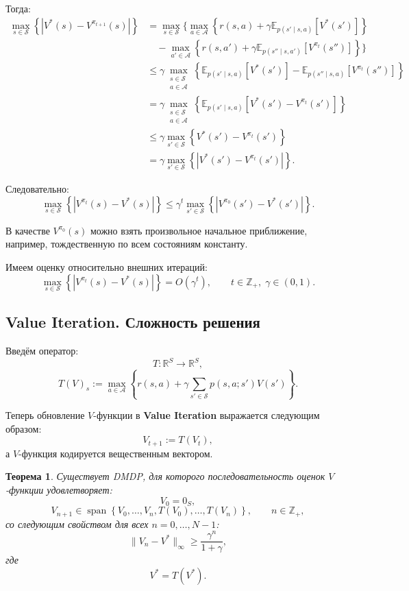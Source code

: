 \documentclass[12pt,a4paper]{article}
\newtheorem{theorem}{Теорема}
\begin{document}
Тогда:
\[
\begin{aligned}
\max_{s \in \mathcal S}
\left\{
|V^\ast(s)-V^{\pi_{t+1}}(s)|
\right\}
&=
\max_{s \in \mathcal S}
\Bigg\{
\max_{a \in \mathcal A}
\left\{
r(s,a)
+
\gamma
\mathbb E_{p(s'\mid s,a)}
\left[
V^\ast(s')
\right]
\right\}
\\
&\quad -
\max_{a' \in \mathcal A}
\left\{
r(s,a')
+
\gamma
\mathbb E_{p(s''\mid s,a')}
\left[
V^{\pi_t}(s'')
\right]
\right\}
\Bigg\}
\\
&\le
\gamma
\max_{\substack{s \in \mathcal S\\ a \in \mathcal A}}
\left\{
\mathbb E_{p(s'\mid s,a)}
\left[
V^\ast(s')
\right]
-
\mathbb E_{p(s''\mid s,a)}
\left[
V^{\pi_t}(s'')
\right]
\right\}
\\
&=
\gamma
\max_{\substack{s \in \mathcal S\\ a \in \mathcal A}}
\left\{
\mathbb E_{p(s'\mid s,a)}
\left[
V^\ast(s')-V^{\pi_t}(s')
\right]
\right\}
\\
&\le
\gamma
\max_{s' \in \mathcal S}
\left\{
V^\ast(s')-V^{\pi_t}(s')
\right\}
\\
&=
\gamma
\max_{s' \in \mathcal S}
\left\{
\left|
V^\ast(s')-V^{\pi_t}(s')
\right|
\right\}.
\end{aligned}
\]

Следовательно:
\[
\max_{s \in \mathcal S}
\left\{
|V^{\pi_t}(s)-V^\ast(s)|
\right\}
\le
\gamma^t
\max_{s' \in \mathcal S}
\left\{
|V^{\pi_0}(s')-V^\ast(s')|
\right\}.
\]

В качестве $V^{\pi_0}(s)$ можно взять произвольное начальное приближение, например, тождественную по всем состояниям константу.

Имеем оценку относительно внешних итераций:
\[
\max_{s \in \mathcal S}
\left\{
|V^{\pi_t}(s)-V^\ast(s)|
\right\}
=
O(\gamma^t),
\qquad
t \in \mathbb Z_+,\; \gamma \in (0,1).
\]

\subsection{Value Iteration. Сложность решения}

Введём оператор:
\[
T : \mathbb R^S \to \mathbb R^S,
\]
\[
T(V)_s
:=
\max_{a \in \mathcal A}
\left\{
r(s,a)
+
\gamma
\sum_{s' \in \mathcal S}
p(s,a;s')V(s')
\right\}.
\]

Теперь обновление $V$-функции в \textbf{Value Iteration} выражается следующим образом:
\[
V_{t+1} := T(V_t),
\]
а $V$-функция кодируется вещественным вектором.

\begin{theorem}
Существует DMDP, для которого последовательность оценок $V$-функции удовлетворяет:
\[
V_0 = 0_S,
\]
\[
V_{n+1}
\in
\operatorname{span}
\left\{
V_0,\ldots,V_n,T(V_0),\ldots,T(V_n)
\right\},
\qquad
n \in \mathbb Z_+,
\]
со следующим свойством для всех $n=0,\ldots,N-1$:
\[
\|V_n - V^\ast\|_\infty
\ge
\frac{\gamma^n}{1+\gamma},
\]
где
\[
V^\ast = T(V^\ast).
\]
\end{theorem}
\end{document}
